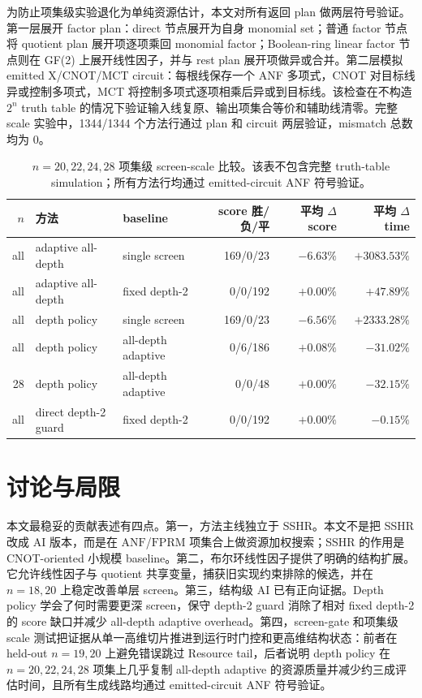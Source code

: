 \documentclass[UTF8,fontset=macnew,11pt]{ctexart}
\newcommand{\anf}{\ensuremath{\mathrm{ANF}}}
\newcommand{\fprm}{\ensuremath{\mathrm{FPRM}}}
\begin{document}
为防止项集级实验退化为单纯资源估计，本文对所有返回 plan 做两层符号验证。第一层展开 factor plan：direct 节点展开为自身 monomial set；普通 factor 节点将 quotient plan 展开项逐项乘回 monomial factor；Boolean-ring linear factor 节点则在 GF(2) 上展开线性因子，并与 rest plan 展开项做异或合并。第二层模拟 emitted X/CNOT/MCT circuit：每根线保存一个 ANF 多项式，CNOT 对目标线异或控制多项式，MCT 将控制多项式逐项相乘后异或到目标线。该检查在不构造 $2^n$ truth table 的情况下验证输入线复原、输出项集合等价和辅助线清零。完整 scale 实验中，1344/1344 个方法行通过 plan 和 circuit 两层验证，mismatch 总数均为 0。

\begin{table}[t]
\centering
\scriptsize
\caption{$n=20,22,24,28$ 项集级 screen-scale 比较。该表不包含完整 truth-table simulation；所有方法行均通过 emitted-circuit ANF 符号验证。}
\label{tab:scale}
\begin{tabular}{rllrrr}
\toprule
$n$ & 方法 & baseline & score 胜/负/平 & 平均 $\Delta$ score & 平均 $\Delta$ time \\
\midrule
all & adaptive all-depth & single screen & 169/0/23 & $-6.63\%$ & $+3083.53\%$ \\
all & adaptive all-depth & fixed depth-2 & 0/0/192 & $+0.00\%$ & $+47.89\%$ \\
all & depth policy & single screen & 169/0/23 & $-6.56\%$ & $+2333.28\%$ \\
all & depth policy & all-depth adaptive & 0/6/186 & $+0.08\%$ & $-31.02\%$ \\
28 & depth policy & all-depth adaptive & 0/0/48 & $+0.00\%$ & $-32.15\%$ \\
all & direct depth-2 guard & fixed depth-2 & 0/0/192 & $+0.00\%$ & $-0.15\%$ \\
\bottomrule
\end{tabular}
\end{table}

\section{讨论与局限}

本文最稳妥的贡献表述有四点。第一，方法主线独立于 SSHR。本文不是把 SSHR 改成 AI 版本，而是在 \anf{}/\fprm{} 项集合上做资源加权搜索；SSHR 的作用是 CNOT-oriented 小规模 baseline。第二，布尔环线性因子提供了明确的结构扩展。它允许线性因子与 quotient 共享变量，捕获旧实现约束排除的候选，并在 $n=18,20$ 上稳定改善单层 screen。第三，结构级 AI 已有正向证据。Depth policy 学会了何时需要更深 screen，保守 depth-2 guard 消除了相对 fixed depth-2 的 score 缺口并减少 all-depth adaptive overhead。第四，screen-gate 和项集级 scale 测试把证据从单一高维切片推进到运行时门控和更高维结构状态：前者在 held-out $n=19,20$ 上避免错误跳过 Resource tail，后者说明 depth policy 在 $n=20,22,24,28$ 项集上几乎复制 all-depth adaptive 的资源质量并减少约三成评估时间，且所有生成线路均通过 emitted-circuit ANF 符号验证。
\end{document}
